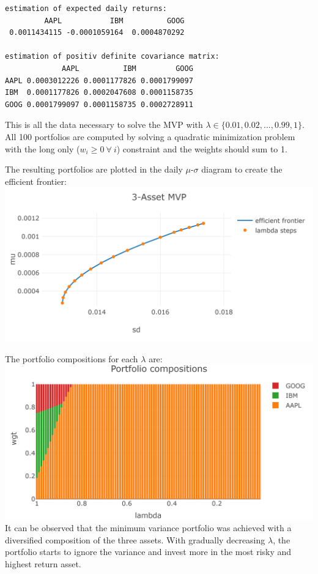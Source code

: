 \documentclass[
  oneside]{book}
\begin{document}
\begin{verbatim}
estimation of expected daily returns:
         AAPL           IBM          GOOG 
 0.0011434115 -0.0001059164  0.0004870292 

estimation of positiv definite covariance matrix:
             AAPL          IBM         GOOG
AAPL 0.0003012226 0.0001177826 0.0001799097
IBM  0.0001177826 0.0002047608 0.0001158735
GOOG 0.0001799097 0.0001158735 0.0002728911
\end{verbatim}

This is all the data necessary to solve the MVP with \(\lambda \in \{0.01, 0.02, ..., 0.99, 1\}\). All 100 portfolios are computed by solving a quadratic minimization problem with the long only (\(w_i \geq 0 \ \forall \ i\)) constraint and the weights should sum to 1.

The resulting portfolios are plotted in the daily \(\mu\)-\(\sigma\) diagram to create the efficient frontier:\\
\includegraphics{Master_Thesis_files/figure-latex/MVP_ex5-1.png}

The portfolio compositions for each \(\lambda\) are:\\
\includegraphics{Master_Thesis_files/figure-latex/MVP_ex6-1.png}
It can be observed that the minimum variance portfolio was achieved with a diversified composition of the three assets. With gradually decreasing \(\lambda\), the portfolio starts to ignore the variance and invest more in the most risky and highest return asset.
\end{document}
